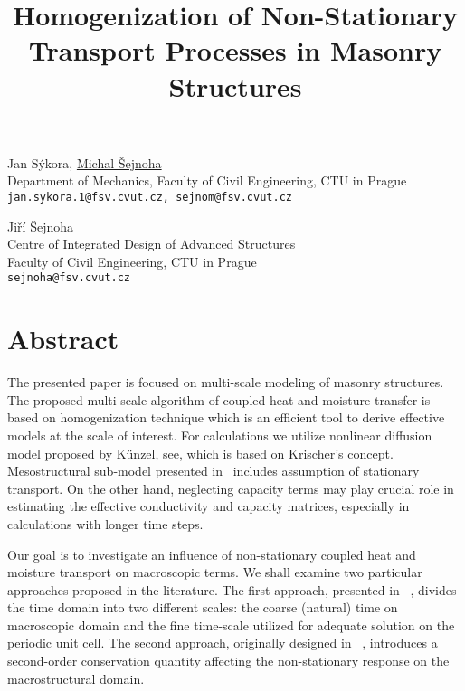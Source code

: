 \title{Homogenization of Non-Stationary Transport Processes in Masonry Structures}
\author{} \institute{}
\maketitle

\begin{center}
{\large Jan S\'{y}kora, \underline{Michal \v{S}ejnoha}}\\
Department of Mechanics, Faculty of Civil Engineering, CTU in Prague\\
{\tt jan.sykora.1@fsv.cvut.cz, sejnom@fsv.cvut.cz}\\
\vspace{4mm}

{\large Ji\v{r}\'{i} \v{S}ejnoha}\\
Centre of Integrated Design of Advanced Structures\\
Faculty of Civil Engineering, CTU in Prague\\
{\tt sejnoha@fsv.cvut.cz}
\end{center}

\section*{Abstract}
The presented paper is focused on multi-scale modeling of masonry structures. The proposed multi-scale algorithm of coupled heat and moisture transfer is based on homogenization technique which is an efficient tool to derive effective models at the scale of interest. For calculations we utilize nonlinear diffusion model proposed by K\"{u}nzel, see\cite{Kunzel97}, which is based on Krischer's concept. Mesostructural sub-model presented in~\cite{Sykora10} includes assumption of stationary transport. On the other hand, neglecting capacity terms may play crucial role in estimating the effective conductivity and capacity matrices, especially in calculations with longer time steps.

Our goal is to investigate an influence of non-stationary coupled heat and moisture transport on macroscopic terms. We shall examine two particular approaches proposed in the literature. The first approach, presented in ~\cite{Fish02,Manchiraju07}, divides the time domain into two different scales: the coarse (natural) time on macroscopic domain and the fine time-scale utilized for adequate solution on the periodic unit cell. The second approach, originally designed in ~\cite{Larsson10}, introduces a second-order conservation quantity affecting the non-stationary response on the macrostructural domain.

